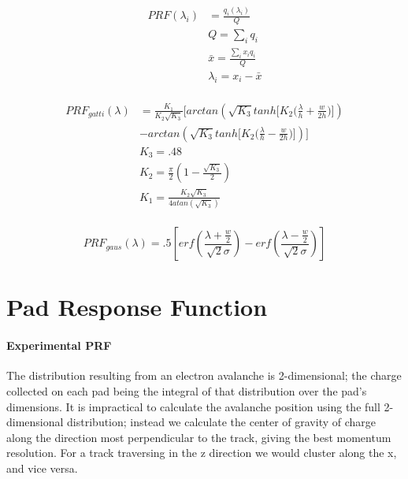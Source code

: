 \documentclass[review]{elsarticle}
\begin{document}
\begin{equation}\label{eq:1}
\begin{split}
PRF(\lambda_i) 
& = \frac{q_i(\lambda_i)}{Q} \\
& Q=\sum_i q_i \\
& \bar{x}= \frac{\sum_i x_i q_i}{Q}\\
& \lambda_i=x_i-\bar{x} \\
\end{split}
\end{equation}

\begin{equation}\label{eq:gatti}
\begin{split}
PRF_{gatti}(\lambda)
& = \frac{K_{1}}{K_{2}\sqrt{K_{3}}}\bigl[arctan(\sqrt{K_{3}}tanh\bigl[K_{2}\bigl(\frac{\lambda}{h}+\frac{w}{2h}\bigr)\bigr]) \\
& - arctan(\sqrt{K_{3}}tanh\bigl[K_{2}\bigl(\frac{\lambda}{h}-\frac{w}{2h}\bigr)\bigr])\bigr] \\
& K_3 = .48\\
& K_2 = \frac{\pi}{2}\left(1-\frac{\sqrt{K_{3}}}{2}\right)\\
& K_1 = \frac{K_{2}\sqrt{K_3}}{4 atan(\sqrt{K_3})}\\
\end{split}
\end{equation}

\begin{equation}\label{eq:gaus}
PRF_{gaus}(\lambda) = .5\left[erf\left(\frac{\lambda+\frac{w}{2}}{\sqrt{2}\sigma}\right) - erf\left(\frac{\lambda-\frac{w}{2}}{\sqrt{2}\sigma}\right) \right]
\end{equation}


\section{Pad Response Function}
\paragraph{Experimental PRF}



The distribution resulting from an electron avalanche is 2-dimensional; the charge collected on each pad being the integral of that distribution over the pad's dimensions. It is impractical to calculate the avalanche position using the full 2-dimensional distribution; instead we calculate the center of gravity of charge along the direction most perpendicular to the track, giving the best momentum resolution. For a track traversing in the z direction we would cluster along the x, and vice versa.
\end{document}
